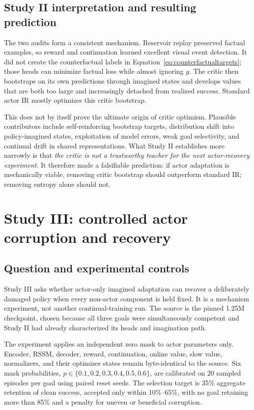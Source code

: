 \documentclass[10pt]{article}
\newcommand{\pct}[1]{#1\%}
\begin{document}
\subsection{Study II interpretation and resulting prediction}

The two audits form a consistent mechanism. Reservoir replay preserved factual examples, so reward and continuation learned excellent visual event detection. It did not create the counterfactual labels in Equation~\ref{eq:counterfactualtargets}; those heads can minimize factual loss while almost ignoring $g$. The critic then bootstraps on its own predictions through imagined states and develops values that are both too large and increasingly detached from realized success. Standard actor IR mostly optimizes this critic bootstrap.

This does not by itself prove the ultimate origin of critic optimism. Plausible contributors include self-reinforcing bootstrap targets, distribution shift into policy-imagined states, exploitation of model errors, weak goal selectivity, and continual drift in shared representations. What Study II establishes more narrowly is that \emph{the critic is not a trustworthy teacher for the next actor-recovery experiment}. It therefore made a falsifiable prediction: if actor adaptation is mechanically viable, removing critic bootstrap should outperform standard IR; removing entropy alone should not.

\section{Study III: controlled actor corruption and recovery}

\subsection{Question and experimental controls}

Study III asks whether actor-only imagined adaptation can recover a deliberately damaged policy when every non-actor component is held fixed. It is a mechanism experiment, not another continual-training run. The source is the pinned 1.25M checkpoint, chosen because all three goals were simultaneously competent and Study II had already characterized its heads and imagination path.

The experiment applies an independent zero mask to actor parameters only. Encoder, RSSM, decoder, reward, continuation, online value, slow value, normalizers, and their optimizer states remain byte-identical to the source. Six mask probabilities, $p\in\{0.1,0.2,0.3,0.4,0.5,0.6\}$, are calibrated on 20 sampled episodes per goal using paired reset seeds. The selection target is \pct{35} aggregate retention of clean success, accepted only within \pct{10}--\pct{65}, with no goal retaining more than \pct{85} and a penalty for uneven or beneficial corruption.
\end{document}

